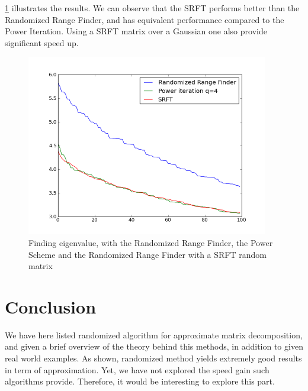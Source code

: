 \documentclass[onecolumn,12pt]{article}
\begin{document}
\ref{eigenvalues} illustrates the results. We can observe that the SRFT
performs better than the Randomized Range Finder, and has equivalent
performance compared to the Power Iteration. Using a SRFT matrix over a
Gaussian one also provide significant speed up.

\begin{figure}[h]
\label{eigenvalues}
\caption{Finding eigenvalue, with the Randomized Range Finder, the Power
Scheme and the Randomized Range Finder with a SRFT random matrix}
\includegraphics[width=400px]{./images/eigenvalue.png}
\end{figure}

\section{Conclusion}

We have here listed randomized algorithm for approximate matrix decomposition,
and given a brief overview of the theory behind this methods, in addition to
given real world examples. As shown, randomized method yields extremely good
results in term of approximation. Yet, we have not explored the speed gain
such algorithms provide. Therefore, it would be interesting to explore this
part.


\end{document}
